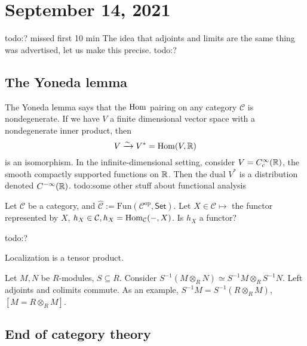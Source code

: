 \section{September 14, 2021} 
{\color{red}todo:? missed first 10 min} 
The idea that adjoints and limits are the same thing was advertised, let us make this precise.
{\color{red}todo:?} 
\subsection{The Yoneda lemma}
The Yoneda lemma says that the $\operatorname{Hom}$ pairing on any category $\mathcal{C} $ is nondegenerate. If we have $V$ a finite dimensional vector space with a nondegenerate inner product, then \[
    V \xrightarrow{\sim} V ^* = \operatorname{Hom} (V ,\mathbb{R})
\] is an isomorphism. In the infinite-dimensional setting, consider $V= C^{\infty}_c (\mathbb{R})$, the smooth compactly supported functions on $\mathbb{R}$. Then the dual $V^*$ is a distribution denoted $C^{-\infty}(\mathbb{R})$. {\color{red}todo:some other stuff about functional analysis} 

Let $\mathcal{C} $ be a category, and $\hat{\mathcal{C} }:= \mathrm{Fun}(\mathcal{C} ^{\mathrm{op} }, \mathsf{Set})$. Let $X \in  \mathcal{C} \mapsto  $ the functor represented by $X$, $h_X \in \mathcal{C} , h_X=\operatorname{Hom} _{\mathcal{C} }(-,X)$. Is $h_X$ a functor? 

{\color{red}todo:?} 

\begin{cor}
    Localization is a tensor product.
\end{cor}

Let $M,N$ be $R$-modules, $S \subseteq R$. Consider $S ^{-1}( M\otimes _R N) \simeq  S ^{-1} M \otimes _R S^{-1} N$. Left adjoints and colimits commute. As an example, $S ^{-1}M = S^{-1} (R \otimes _R M)$, $[M= R \otimes _R M]$.

\subsection{End of category theory}

